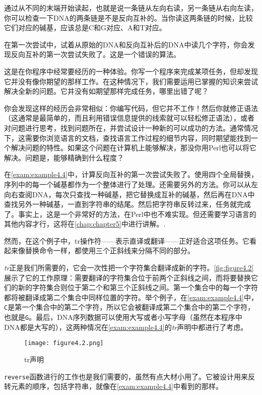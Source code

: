 通过从不同的末端开始读起，也就是说一条链从左向右读，另一条链从右向左读，你可以检查一下DNA的两条链是不是反向互补的。当你读这两条链的时候，比较它们对应的碱基，应该总是C和G对应、A和T对应。

在第一次尝试中，试着从原始的DNA和反向互补后的DNA中读几个字符，你会发现反向互补的第一次尝试失败了。这是一个错误的算法。

这是在你程序中经常要经历的一种体验。你写一个程序来完成某项任务，但却发现它并没有像你期望的那样工作。在这种情况下，我们需要运用已掌握的知识来尝试解决全新的问题。它并没有如期望那样完成任务，哪里出错了呢？

你会发现这样的经历会非常相似：你编写代码，但它并不工作！然后你就修正语法（这通常是最简单的，而且利用错误信息提供的线索就可以轻松修正语法），或者对问题进行思考，找到问题所在，并尝试设计一种新的可以成功的方法。通常情况下，这需要你浏览语言的文档，查找语言工作过程的细节内容，同时期望能找到一个解决问题的特性。如果这个问题在计算机上能够解决，那没你用Perl也可以将它解决。问题是，能够精确到什么程度？

在\autoref{exam:example4.4}中，计算反向互补的第一次尝试失败了。使用四个全局替换，序列中的每一个碱基都作为一个整体进行了处理。还需要另外的方法。你可以从左向右查阅DNA，每次只查找一种碱基，把它替换成互补的碱基，然后再在DNA中查找另外一种碱基，一直到字符串的结尾。然后把字符串反转过来，任务就完成了。事实上，这是一个非常好的方法，在Perl中也不难实现。但还需要学习语言的其他内容才行，这将在\autoref{chap:chapter5}中进行讲解。.

然而，在这个例子中，tr操作符——表示直译或翻译——正好适合这项任务。它看起来像替换命令一样，都使用三个正斜线来分隔不同的部分。

\textit{tr}正是我们所需要的，它会一次性把一个字符集合翻译成新的字符。\autoref{fig:figure4.2}展示了它的工作原理：需要翻译的字符集合位于前两个正斜线之间，而将要替换它们的新的字符集合则位于第二个和第三个正斜线之间。第一个集合中的每一个字符都将被翻译成第二个集合中同样位置的字符。举个例子，在\autoref{exam:example4.4}中，\verb|C|是第一个集合中的第二个字符，所以它会被翻译成第二个集合中的第二个字符，也就是\verb|G|。最后，DNA序列数据可以使用大写或者小写字母（虽然在本程序中DNA都是大写的），这两种情况在\autoref{exam:example4.4}的\textit{tr}声明中都进行了考虑。

\begin{figure}
  \centering
  \texttt{[image: figure4.2.png]}
  \caption{tr声明}
  \label{fig:figure4.2}
\end{figure}

\verb|reverse|函数进行的工作也是我们需要的，虽然有点大材小用了。它被设计用来反转元素的顺序，包括字符串，就像在\autoref{exam:example4.4}中看到的那样。

